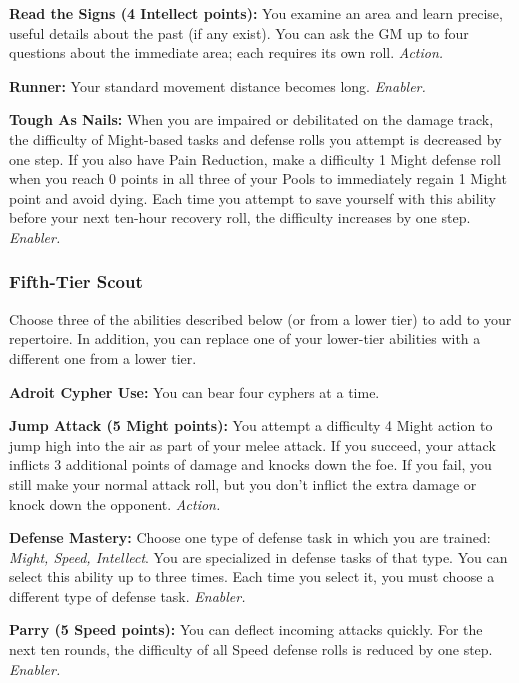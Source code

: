 \documentclass[a4paper,10pt,final,twocolumn,oneside]{book}
\newcommand{\itemAbility}[2]{\textcolor{25gray}{\textbullet\textbf{ #1:}}{ #2}\par}
\newcommand{\enabler}{\textit{ Enabler.}}
\newcommand{\action}{\textit{ Action.}}
\begin{document}
\itemAbility{Read the Signs (4 Intellect points)}{You examine an area and learn precise, useful details about the past (if any exist). You can ask the GM up to four questions about the immediate area; each requires its own roll.\action}

\itemAbility{Runner}{Your standard movement distance becomes long.\enabler}

\itemAbility{Tough As Nails}{When you are impaired or debilitated on the damage track, the difficulty of Might-based tasks and defense rolls you attempt is decreased by one step. If you also have Pain Reduction, make a difficulty 1 Might defense roll when you reach 0 points in all three of your Pools to immediately regain 1 Might point and avoid dying. Each time you attempt to save yourself with this ability before your next ten-hour recovery roll, the difficulty increases by one step.\enabler}


\subsubsection*{Fifth-Tier Scout}
\label{subsub:scoutFifthTier}

Choose three of the abilities described below (or from a lower tier) to add to your repertoire. In addition, you can replace one of your lower-tier abilities with a different one from a lower tier.

\itemAbility{Adroit Cypher Use}{You can bear four cyphers at a time.}

\itemAbility{Jump Attack (5 Might points)}{You attempt a difficulty 4 Might action to jump high into the air as part of your melee attack. If you succeed, your attack inflicts 3 additional points of damage and knocks down the foe. If you fail, you still make your normal attack roll, but you don’t inflict the extra damage or knock down the opponent.\action}

\itemAbility{Defense Mastery}{Choose one type of defense task in which you are trained: \textit{Might, Speed, Intellect}. You are specialized in defense tasks of that type. You can select this ability up to three times. Each time you select it, you must choose a different type of defense task.\enabler}

\itemAbility{Parry (5 Speed points)}{You can deflect incoming attacks quickly. For the next ten rounds, the difficulty of all Speed defense rolls is reduced by one step.\enabler}
\end{document}
